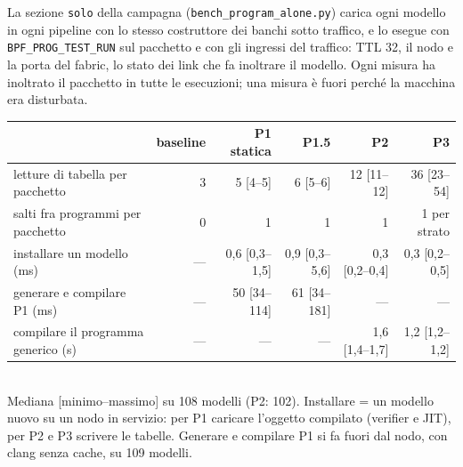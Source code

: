 \documentclass[11pt,a4paper,oneside]{report}
\begin{document}
La sezione \texttt{solo} della campagna (\texttt{bench\_program\_alone.py}) carica ogni
modello in ogni pipeline con lo stesso costruttore dei banchi sotto traffico, e
lo esegue con \texttt{BPF\_PROG\_TEST\_RUN} sul pacchetto e con gli ingressi del
traffico: TTL 32, il nodo e la porta del fabric, lo stato dei link che fa
inoltrare il modello. Ogni misura ha inoltrato il pacchetto in tutte le
esecuzioni; una misura è fuori perché la macchina era disturbata.

\begin{center}
\small
\begin{tabular}{@{}lrrrrr@{}}
\toprule
& \textbf{baseline} & \textbf{P1 statica} & \textbf{P1.5} & \textbf{P2} & \textbf{P3} \\
\midrule
letture di tabella per pacchetto & 3 & 5 [4--5] & 6 [5--6] & 12 [11--12] & 36 [23--54] \\
salti fra programmi per pacchetto & 0 & 1 & 1 & 1 & 1 per strato \\
installare un modello (ms) & --- & 0,6 [0,3--1,5] & 0,9 [0,3--5,6] & 0,3 [0,2--0,4] & 0,3 [0,2--0,5] \\
generare e compilare P1 (ms) & --- & 50 [34--114] & 61 [34--181] & --- & --- \\
compilare il programma generico (s) & --- & --- & --- & 1,6 [1,4--1,7] & 1,2 [1,2--1,2] \\
\bottomrule
\end{tabular}\\[2pt]
{\footnotesize\color{soft} Mediana [minimo--massimo] su 108 modelli (P2: 102). Installare =
un modello nuovo su un nodo in servizio: per P1 caricare l'oggetto compilato
(verifier e JIT), per P2 e P3 scrivere le tabelle. Generare e compilare P1 si fa
fuori dal nodo, con clang senza cache, su 109 modelli.}
\end{center}
\end{document}

